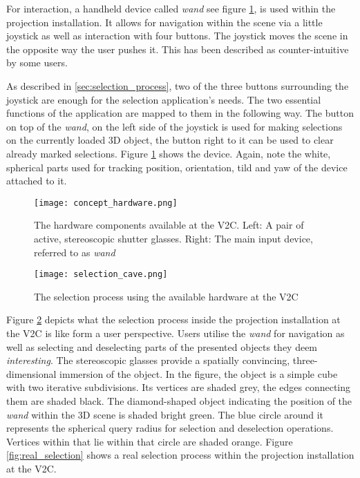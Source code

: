 For interaction, a handheld device called \textit{wand} see figure \ref{fig:concept_hardware}, is used within the projection installation. It allows for navigation within the scene via a little joystick as well as interaction with four buttons. The joystick moves the scene in the opposite way the user pushes it. This has been described as counter-intuitive by some users.

As described in \ref{sec:selection_process}, two of the three buttons surrounding the joystick are enough for the selection application's needs. The two essential functions of the application are mapped to them in the following way. The button on top of the \textit{wand}, on the left side of the joystick is used for making selections on the currently loaded 3D object, the button  right to it can be used to clear already marked selections. Figure \ref{fig:concept_hardware} shows the device. Again, note the white, spherical parts used for tracking position, orientation, tild and yaw of the device attached to it.

\begin{figure}[htb]
  \centering
  \texttt{[image: concept\_hardware.png]}\\ %
  \caption{The hardware components available at the V2C. Left: A pair of active, stereoscopic shutter glasses. Right: The main input device, referred to as \textit{wand}}
  \label{fig:concept_hardware}
\end{figure}

\begin{figure}[htb]
  \centering
  \texttt{[image: selection\_cave.png]}\\ %
  \caption{The selection process using the available hardware at the V2C}\label{fig:selection_cave}
\end{figure}

Figure \ref{fig:selection_cave} depicts what the selection process inside the projection installation at the V2C is like form a user perspective. Users utilise the \textit{wand} for navigation as well as selecting and deselecting parts of the presented objects they deem \textit{interesting}. The stereoscopic glasses provide a spatially convincing, three-dimensional immersion of the object. In the figure, the object is a simple cube with two iterative subdivisions. Its vertices are shaded grey, the edges connecting them are shaded black. The diamond-shaped object indicating the position of the \textit{wand} within the 3D scene is shaded bright green. The blue circle around it represents the spherical query radius for selection and deselection operations. Vertices within that lie within that circle are shaded orange. Figure \ref{fig:real_selection} shows a real selection process within the projection installation at the V2C.


